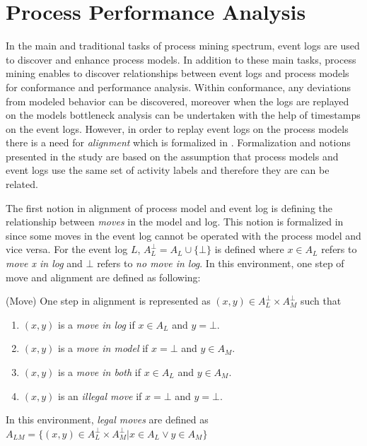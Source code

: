 \section{Process Performance Analysis}
\label{sec:process-performance-analysis}
In the main and traditional tasks of process mining spectrum, event logs are used to discover and enhance process models. In addition to these main tasks, process mining enables to discover relationships between event logs and process models for conformance and performance analysis. Within conformance, any deviations from modeled behavior can be discovered, moreover when the logs are replayed on the models bottleneck analysis can be undertaken with the help of timestamps on the event logs. However, in order to replay event logs on the process models there is a need for \textit{alignment} which is formalized in \cite{van2012replaying}. Formalization and notions presented in the study \cite{van2012replaying} are based on the assumption that process models and event logs use the same set of activity labels and therefore they are can be related.

The first notion in alignment of process model and event log is defining the relationship between \textit{moves} in the model and log. This notion is formalized in \cite{van2012replaying} since some moves in the event log cannot be operated with the process model and vice versa. For the event log $L$, $A_{L}^{\bot} = A_{L} \cup \{ \bot\}$ is defined where $x \in A_{L}$ refers to \textit{move x in log} and $\bot$ refers to \textit{no move in log}. In this environment, one step of move and alignment are defined as following:

\theoremstyle{definition}
\begin{definition}{}
(Move) One step in alignment is represented as $(x,y) \in A_{L}^{\bot} \times A_{M}^{\bot}$ such that
\begin{enumerate}
  \item $(x,y)$ is a \textit{move in log} if $ x \in A_{L}$ and $y=\bot$.
  \item $(x,y)$ is a \textit{move in model} if $x=\bot$ and $y \in A_{M}$.
  \item $(x,y)$ is a \textit{move in both} if $x \in A_{L}$ and $y \in A_{M}$.
  \item $(x,y)$ is an \textit{illegal move} if $x=\bot$ and $y=\bot$.
\end{enumerate}
In this environment, \textit{legal moves} are defined as $A_{LM} = \{ (x,y) \in A_{L}^{\bot} \times A_{M}^{\bot} |  x \in A_{L} \vee y \in A_{M} \}$
\end{definition}

